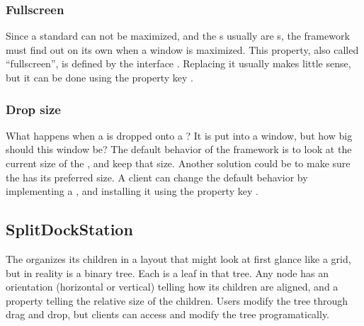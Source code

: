 
\subsubsection{Fullscreen}
Since a standard  can not be maximized, and the s usually are s, the framework must find out on its own when a window is maximized. This property, also called ``fullscreen'', is defined by the interface . Replacing it usually makes little sense, but it can be done using the property key .


\subsubsection{Drop size}
What happens when a  is dropped onto a ? It is put into a window, but how big should this window be? The default behavior of the framework is to look at the current size of the , and keep that size. Another solution could be to make sure the  has its preferred size. A client can change the default behavior by implementing a , and installing it using the property key \linebreak {}.

\subsection{SplitDockStation}
The  organizes its children in a layout that might look at first glance like a grid, but in reality is a binary tree. Each  is a leaf in that tree. Any node has an orientation (horizontal or vertical) telling how its children are aligned, and a  property telling the relative size of the children. Users modify the tree through drag and drop, but clients can access and modify the tree programatically.

